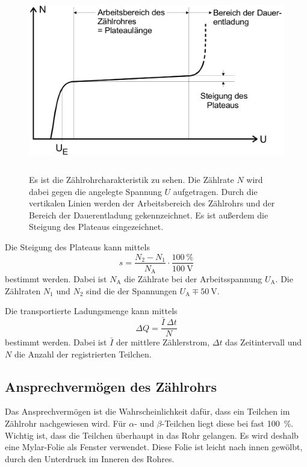 \begin{figure}
    \centering
    \includegraphics[width=12cm, height=8cm]{build/charakteristik.png}
    \caption{Es ist die Zählrohrcharakteristik zu sehen. Die Zählrate $N$ wird dabei gegen die angelegte Spannung $U$ aufgetragen. Durch die vertikalen Linien werden der Arbeitsbereich des Zählrohrs und der Bereich der Dauerentladung gekennzeichnet. Es ist außerdem die Steigung des Plateaus eingezeichnet. \cite{V703}}
    \label{fig:charakteristik}
\end{figure}

\noindent Die Steigung des Plateaus kann mittels
\begin{equation}
    s = \frac{N_2 - N_1}{N_\text{A}} \cdot \frac{\SI{100}{\percent}}{\SI{100}{\volt}}
    \label{steigung}
\end{equation}
bestimmt werden. Dabei ist $N_\text{A}$ die Zählrate bei der Arbeitsspannung $U_\text{A}$. Die Zählraten $N_1$ und $N_2$ sind die der Spannungen $U_\text{A} \mp \SI{50}{\volt}$.

\noindent Die transportierte Ladungsmenge kann mittels
\begin{equation}
    \Delta Q = \frac{\bar{I} \ \Delta t}{N}
    \label{ladung}
\end{equation}
bestimmt werden. Dabei ist $\bar{I}$ der mittlere Zählerstrom, $\Delta t$ das Zeitintervall und $N$ die Anzahl der registrierten Teilchen.

\subsection{Ansprechvermögen des Zählrohrs}

Das Ansprechvermögen ist die Wahrscheinlichkeit dafür, dass ein Teilchen im Zählrohr nachgewiesen wird. Für $\alpha$- und $\beta$-Teilchen liegt diese bei fast \SI{100}{\percent}. Wichtig ist, dass die Teilchen überhaupt in das Rohr gelangen. Es wird deshalb eine Mylar-Folie als Fenster verwendet. Diese Folie ist leicht nach innen gewölbt, durch den Unterdruck im Inneren des Rohres. %